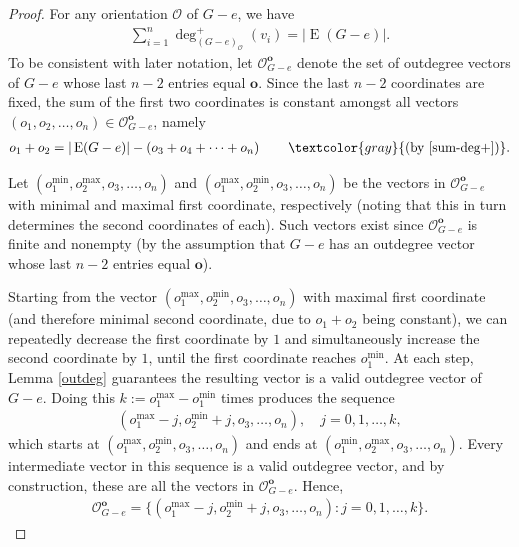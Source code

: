 \documentclass[12pt]{article}
\theoremstyle{definition}
\theoremstyle{remark}
\newcommand{\tup}[1]{\left( #1 \right)}
\newcommand{\out}{\mathscr{O}}
\begin{document}
\begin{proof}
    For any orientation $\mathcal{O}$ of $G-e$, we have \begin{align}
        \sum_{i=1}^n\deg_{(G-e)_{\mathcal{O}}}^+(v_i) = |\operatorname{E}(G-e)|.
		\label{sum-deg+}
    \end{align} To be consistent with later notation, let $\mathscr{O}_{G-e}^\mathbf{o}$ denote the set of outdegree vectors of $G-e$ whose last $n-2$ entries equal $\mathbf{o}$. Since the last $n-2$ coordinates are fixed, the sum of the first two coordinates is constant amongst all vectors $(o_1, o_2, \ldots, o_n) \in \out_{G-e}^{\mathbf{o}}$, namely
		\begin{align*}
		o_1 + o_2 = |\operatorname{E}(G-e)| - \tup{o_3 + o_4 + \cdots + o_n} \qquad \textcolor{gray}{\tup{\text{by \eqref{sum-deg+}}}}.
		\end{align*}

		Let $(o_1^{\min},o_2^{\max},o_3,\ldots,o_n)$ and $(o_1^{\max},o_2^{\min},o_3,\ldots,o_n)$ be the vectors in $\out_{G-e}^{\mathbf{o}}$ with minimal and maximal first coordinate, respectively (noting that this in turn determines the second coordinates of each). Such vectors exist since $\out_{G-e}^\mathbf{o}$ is finite and nonempty (by the assumption that $G-e$ has an outdegree vector whose last $n-2$ entries equal $\mathbf{o}$).
		
		Starting from the vector $(o_1^{\max},o_2^{\min},o_3,\ldots,o_n)$ with maximal first coordinate (and therefore minimal second coordinate, due to $o_1+o_2$ being constant), we can repeatedly decrease the first coordinate by $1$ and simultaneously increase the second coordinate by $1$, until the first coordinate reaches $o_1^{\min}$.
		At each step, Lemma \ref{outdeg} guarantees the resulting vector is a valid outdegree vector of $G-e$. Doing this $k := o_1^{\max}-o_1^{\min}$ times produces the sequence \begin{align*}
			(o_1^{\max}-j,o_2^{\min}+j,o_3,\ldots,o_n), \quad j=0,1,\ldots,k,
		\end{align*} which starts at $(o_1^{\max},o_2^{\min},o_3,\ldots,o_n)$ and ends at $(o_1^{\min},o_2^{\max},o_3,\ldots,o_n)$. Every intermediate vector in this sequence is a valid outdegree vector, and by construction, these are all the vectors in $\out_{G-e}^{\mathbf{o}}$. Hence, \begin{align*}
			\out_{G-e}^{\mathbf{o}} = \{(o_1^{\max}-j,o_2^{\min}+j,o_3,\ldots,o_n) : j=0,1,\ldots,k\}. \tag*{\qedhere}
		\end{align*}
\end{proof}
\end{document}
